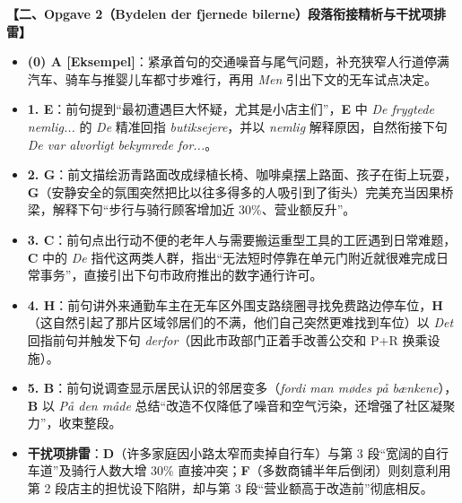 \begin{answerbox}
\textbf{\color{NCDNavy}【二、Opgave 2（Bydelen der fjernede bilerne）段落衔接精析与干扰项排雷】}
\begin{itemize}
  \item \textbf{(0) A [Eksempel]}：紧承首句的交通噪音与尾气问题，补充狭窄人行道停满汽车、骑车与推婴儿车都寸步难行，再用 \textit{Men} 引出下文的无车试点决定。
  \item \textbf{1. E}：前句提到“最初遭遇巨大怀疑，尤其是小店主们”，\textbf{E} 中 \textit{De frygtede nemlig...} 的 \textit{De} 精准回指 \textit{butiksejere}，并以 \textit{nemlig} 解释原因，自然衔接下句 \textit{De var alvorligt bekymrede for...}。
  \item \textbf{2. G}：前文描绘沥青路面改成绿植长椅、咖啡桌摆上路面、孩子在街上玩耍，\textbf{G}（安静安全的氛围突然把比以往多得多的人吸引到了街头）完美充当因果桥梁，解释下句“步行与骑行顾客增加近 30\%、营业额反升”。
  \item \textbf{3. C}：前句点出行动不便的老年人与需要搬运重型工具的工匠遇到日常难题，\textbf{C} 中的 \textit{De} 指代这两类人群，指出“无法短时停靠在单元门附近就很难完成日常事务”，直接引出下句市政府推出的数字通行许可。
  \item \textbf{4. H}：前句讲外来通勤车主在无车区外围支路绕圈寻找免费路边停车位，\textbf{H}（这自然引起了那片区域邻居们的不满，他们自己突然更难找到车位）以 \textit{Det} 回指前句并触发下句 \textit{derfor}（因此市政部门正着手改善公交和 P+R 换乘设施）。
  \item \textbf{5. B}：前句说调查显示居民认识的邻居变多（\textit{fordi man mødes på bænkene}），\textbf{B} 以 \textit{På den måde} 总结“改造不仅降低了噪音和空气污染，还增强了社区凝聚力”，收束整段。
  \item \textbf{干扰项排雷}：\textbf{D}（许多家庭因小路太窄而卖掉自行车）与第 3 段“宽阔的自行车道”及骑行人数大增 30\% 直接冲突；\textbf{F}（多数商铺半年后倒闭）则刻意利用第 2 段店主的担忧设下陷阱，却与第 3 段“营业额高于改造前”彻底相反。
\end{itemize}
\end{answerbox}

